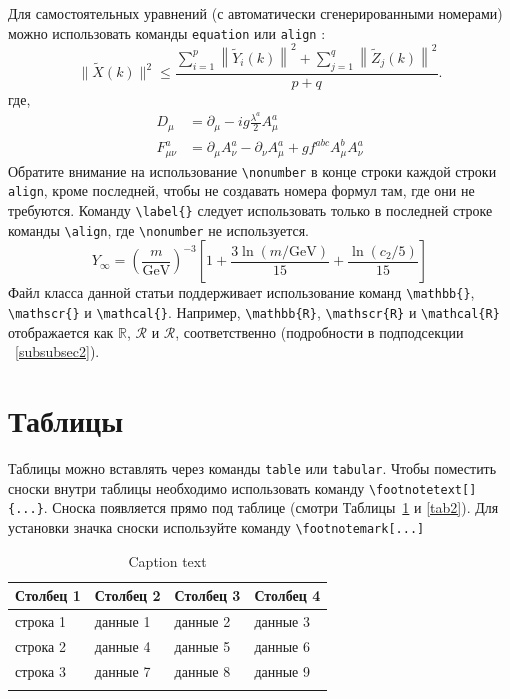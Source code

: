 \documentclass[pdflatex,sn-mathphys-gost]{pmi-jnl}
\begin{document}
Для самостоятельных уравнений (с автоматически сгенерированными номерами) можно использовать команды \verb+equation+ или \verb+align+
:
\begin{equation}
\|\tilde{X}(k)\|^2 \leq\frac{\sum\limits_{i=1}^{p}\left\|\tilde{Y}_i(k)\right\|^2+\sum\limits_{j=1}^{q}\left\|\tilde{Z}_j(k)\right\|^2 }{p+q}.\label{eq1}
\end{equation}
где,
\begin{align}
D_\mu &=  \partial_\mu - ig \frac{\lambda^a}{2} A^a_\mu \nonumber \\
F^a_{\mu\nu} &= \partial_\mu A^a_\nu - \partial_\nu A^a_\mu + g f^{abc} A^b_\mu A^a_\nu \label{eq2}
\end{align}
Обратите внимание на использование \verb+\nonumber+ в конце строки каждой строки \verb+align+, кроме последней, чтобы не создавать номера формул там, где они не требуются. Команду \verb+\label{}+
следует использовать только в последней строке команды \verb+\align+, где \verb+\nonumber+ не используется.
\begin{equation}
Y_\infty = \left( \frac{m}{\textrm{GeV}} \right)^{-3}
    \left[ 1 + \frac{3 \ln(m/\textrm{GeV})}{15}
    + \frac{\ln(c_2/5)}{15} \right]
\end{equation}
Файл класса данной статьи поддерживает использование команд \verb+\mathbb{}+, \verb+\mathscr{}+ и
\verb+\mathcal{}+. Например, \verb+\mathbb{R}+, \verb+\mathscr{R}+
и \verb+\mathcal{R}+ отображается как $\mathbb{R}$, $\mathscr{R}$ и $\mathcal{R}$, соответственно (подробности в подподсекции ~\ref{subsubsec2}).

\section{Таблицы}\label{sec5}

Таблицы можно вставлять через команды \verb+table+ или \verb+tabular+.
Чтобы поместить сноски внутри таблицы необходимо использовать команду \verb+\footnotetext[]{...}+.
Сноска появляется прямо под таблице (смотри Таблицы~\ref{tab1} и \ref{tab2}). 
Для установки значка сноски используйте команду \verb+\footnotemark[...]+

\begin{table}[h]
\caption{Caption text}\label{tab1}%
\begin{tabular}{@{}llll@{}}
\toprule
Столбец 1 & Столбец 2  & Столбец 3 & Столбец 4\\
\midrule
строка 1    & данные 1   & данные 2  & данные 3  \\
строка 2    & данные 4   & данные 5\footnotemark[1]  & данные 6  \\
строка 3    & данные 7   & данные 8  & данные 9\footnotemark[2]  \\
\botrule
\end{tabular}
\end{table}
\end{document}
